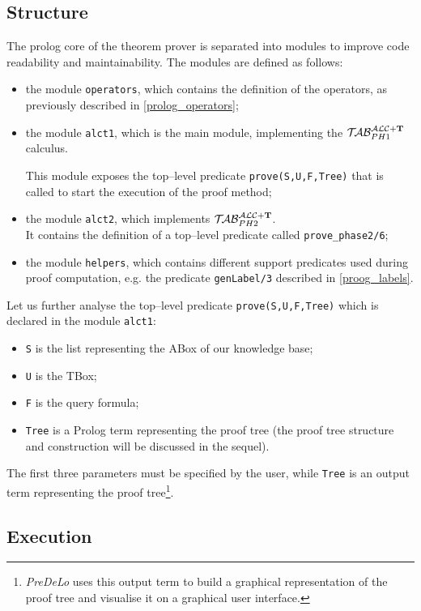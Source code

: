 \documentclass[a4paper, 11pt, oneside]{duthesis}
\newcommand{\tip}{{\bf T}}
\newcommand{\primo}{\mathrel{{\mathcal{T}\!\mathcal{AB}}}_{PH 1}^{\mathcal{ALC}+\mbox{\scriptsize $\tip$}}}
\newcommand{\secondo}{\mathrel{{\mathcal{T}\!\mathcal{AB}}}_{PH 2}^{\mathcal{ALC}+\mbox{\scriptsize $\tip$}}}
\begin{document}
\newpage

\subsection{Structure}
The prolog core of the theorem prover is separated into modules to improve code readability and maintainability.
The modules are defined as follows:
\begin{itemize}
\item the module \texttt{operators}, which contains the definition of the operators, as previously described in \ref{prolog_operators};
\item the module \texttt{alct1}, which is the main module, implementing the $\primo$ calculus.

This module exposes the top--level predicate \texttt{prove(S,U,F,Tree)} that is called to start the execution of the proof method;
\item the module \texttt{alct2}, which implements $\secondo$.\\It contains the definition of a top--level predicate called \texttt{prove\_phase2/6};
\item the module \texttt{helpers}, which contains different support predicates used during proof computation, e.g. the predicate \texttt{genLabel/3} described in \ref{proog_labels}.
\end{itemize}

Let us further analyse the top--level predicate \texttt{prove(S,U,F,Tree)} which is declared in the module \texttt{alct1}:

\begin{itemize}
\item \texttt{S} is the list representing the ABox of our knowledge base;
\item \texttt{U} is the TBox;
\item \texttt{F} is the query formula;
\item \texttt{Tree} is a Prolog term representing the proof tree (the proof tree structure and construction will be discussed in the sequel).
\end{itemize}
The first three parameters must be specified by the user, while \texttt{Tree} is an output term representing the proof tree\footnote{\emph{PreDeLo} uses this output term to build a graphical representation of the proof tree and visualise it on a graphical user interface.}.\\

\subsection{Execution}\label{predelo_execution}
\end{document}
